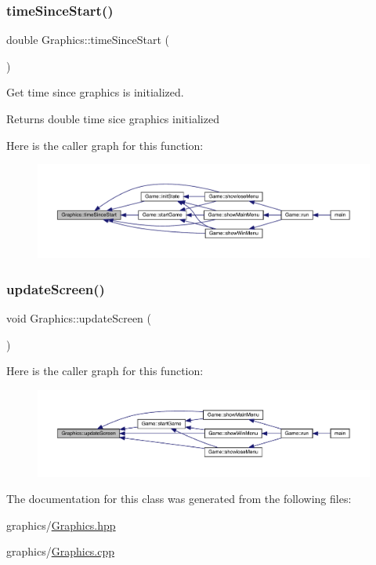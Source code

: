 \subsubsection{\texorpdfstring{time\+Since\+Start()}{timeSinceStart()}}
{\footnotesize\ttfamily double Graphics\+::time\+Since\+Start (\begin{DoxyParamCaption}{ }\end{DoxyParamCaption})}



Get time since graphics is initialized. 

\begin{DoxyReturn}{Returns}
double time sice graphics initialized 
\end{DoxyReturn}
Here is the caller graph for this function\+:
\nopagebreak
\begin{figure}[H]
\begin{center}
\leavevmode
\includegraphics[width=350pt]{class_graphics_a35b4a23e0938ba205ce2a73ee7df5ea0_icgraph}
\end{center}
\end{figure}
\mbox{\label{class_graphics_a3621b0f55951fb891a5ac2ad7dd403a0}} 
\subsubsection{\texorpdfstring{update\+Screen()}{updateScreen()}}
{\footnotesize\ttfamily void Graphics\+::update\+Screen (\begin{DoxyParamCaption}{ }\end{DoxyParamCaption})}

Here is the caller graph for this function\+:
\nopagebreak
\begin{figure}[H]
\begin{center}
\leavevmode
\includegraphics[width=350pt]{class_graphics_a3621b0f55951fb891a5ac2ad7dd403a0_icgraph}
\end{center}
\end{figure}


The documentation for this class was generated from the following files\+:\begin{DoxyCompactItemize}
\item 
graphics/\mbox{\hyperlink{_graphics_8hpp}{Graphics.\+hpp}}\item 
graphics/\mbox{\hyperlink{_graphics_8cpp}{Graphics.\+cpp}}\end{DoxyCompactItemize}
